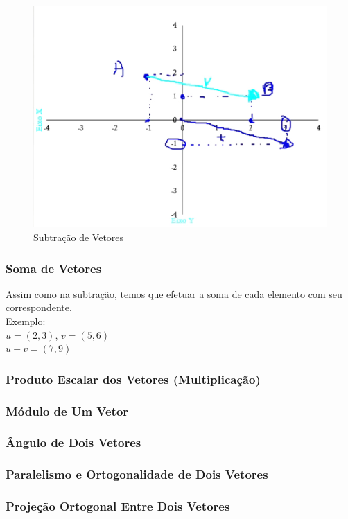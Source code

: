 \documentclass[12pt]{article}
\begin{document}
\begin{figure}
	\centering
	\includegraphics[width=0.7\linewidth]{figuras/subtracao_vetores_01}
	\caption[Subtração de Vetores]{Subtração de Vetores}
	\label{fig:subtracaovetores01}
\end{figure}

\pagebreak
\subsubsection{Soma de Vetores}

Assim como na subtração, temos que efetuar a soma de cada elemento com seu correspondente.\\

Exemplo:\\

\(u = (2, 3)\), \(v = (5, 6)\)\\

\(u + v = (7, 9)\)\\

\subsubsection{Produto Escalar dos Vetores (Multiplicação)}
\subsubsection{Módulo de Um Vetor}
\subsubsection{Ângulo de Dois Vetores}
\subsubsection{Paralelismo e Ortogonalidade de Dois Vetores}
\subsubsection{Projeção Ortogonal Entre Dois Vetores}


\newpage

	
\end{document}
